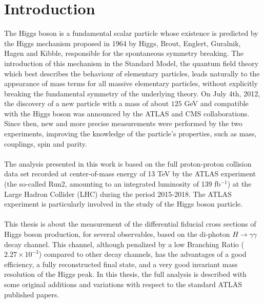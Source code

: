 \chapter*{Introduction}
The Higgs boson is a fundamental scalar particle whose existence is predicted by the Higgs mechanism proposed in 1964 by Higgs, Brout, Englert, Guralnik, Hagen and Kibble, responsible for the spontaneous symmetry breaking. The introduction of this mechanism in the Standard Model, the quantum field theory which best describes the behaviour of elementary particles, leads naturally to the appearance of mass terms for all massive elementary particles, without explicitly breaking the fundamental symmetry of the underlying theory. On July 4th, 2012, the discovery of a new particle with a mass of about $125$ GeV and compatible with the Higgs boson was announced by the ATLAS and CMS collaborations. Since then, new and more precise measurements were performed by the two experiments, improving the knowledge of the particle's properties, such as mass, couplings, spin and parity.
\\\\
The analysis presented in this work is based on the full proton-proton collision data set recorded at center-of-mass energy of 13 TeV by the ATLAS experiment (the so-called Run2, amounting to an integrated luminosity of 139 fb$^{-1}$) at the Large Hadron Collider (LHC) during the period 2015-2018. The ATLAS experiment is particularly involved in the study of the Higgs boson particle.
\\\\
This thesis is about the measurement of the differential fiducial cross sections of Higgs boson production, for several observables, based on the di-photon $H \rightarrow \gamma\gamma$ decay channel.
This channel, although penalized by a low Branching Ratio ($2.27 \times 10^{-3}$) compared to other decay channels, has the advantages of a good efficiency, a fully reconstructed final state, and a very good invariant mass resolution of the Higgs peak. In this thesis, the full analysis is described with some original additions and variations with respect to the standard ATLAS published papers.
\\\\
